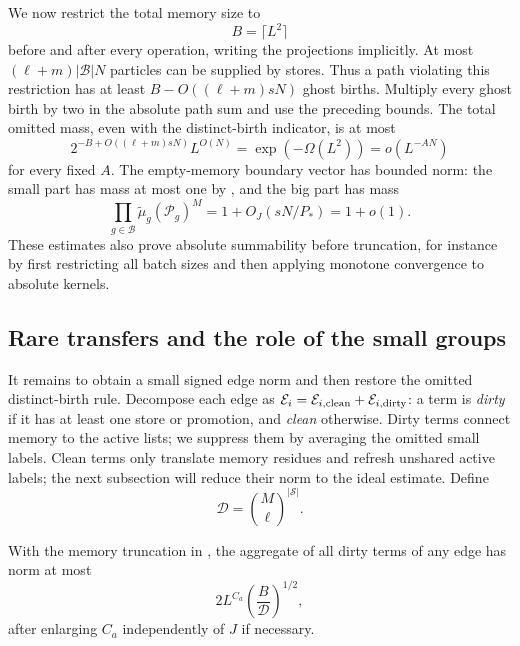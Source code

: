 We now restrict the total memory size to
\begin{equation}\label{eq:memory-truncation}
 B=\lceil L^2\rceil
\end{equation}
before and after every operation, writing the projections
implicitly.  At most $(\ell+m)|\mathcal B|N$ particles can
be supplied by stores.  Thus a path violating this restriction
has at least $B-O((\ell+m)sN)$ ghost births.  Multiply every
ghost birth by two in the absolute path sum and use the
preceding bounds.  The total omitted mass, even with the
distinct-birth indicator, is at most
\begin{equation}\label{eq:memory-tail}
 2^{-B+O((\ell+m)sN)}L^{O(N)}
 =\exp(-\Omega(L^2))=o(L^{-AN})
\end{equation}
for every fixed $A$.  The empty-memory boundary vector has
bounded norm: the small part has mass at most one by
, and the big part has mass
\[
 \prod_{g\in\mathcal B}
 \widetilde\mu_g(\mathcal P_g)^M
 =1+O_J(sN/P_*)=1+o(1).
\]
These estimates also prove absolute summability before
truncation, for instance by first restricting all batch sizes
and then applying monotone convergence to absolute kernels.

\subsection{Rare transfers and the role of the small groups}

It remains to obtain a small signed edge norm and then restore the
omitted distinct-birth rule.  Decompose each edge as
$\mathcal E_i=\mathcal E_{i,\rm clean}+\mathcal E_{i,\rm dirty}$:
a term is \emph{dirty} if it has at least one store or promotion, and
\emph{clean} otherwise.  Dirty terms connect memory to the active lists;
we suppress them by averaging the omitted small labels.  Clean terms
only translate memory residues and refresh unshared active labels; the
next subsection will reduce their norm to the ideal estimate.  Define
\begin{equation}\label{eq:small-omission-number}
 \mathcal D=\binom{M}{\ell}^{|\mathcal S|}.
\end{equation}

\begin{lemma}\label{lem:rare-transfer}
With the memory truncation in , the
aggregate of all dirty terms of any edge has norm at most
\begin{equation}\label{eq:dirty-norm}
 2L^{C_a}\left(\frac B{\mathcal D}\right)^{1/2},
\end{equation}
after enlarging $C_a$ independently of $J$ if necessary.
\end{lemma}

